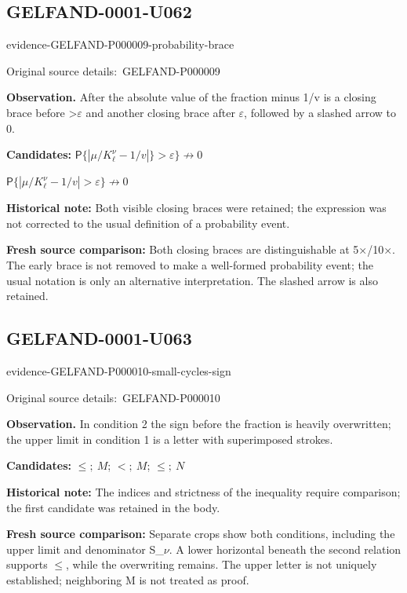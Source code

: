 \documentclass[11pt]{article}
\newcommand{\EvidenceBlock}[4]{%
 \par\smallskip\noindent\begin{minipage}{\linewidth}
 \begin{minipage}[t]{.47\linewidth}\vspace{0pt}\centering
 \csname evidence-#1-#2\endcsname\par
 {\scriptsize\SourceCropCaption\ #1}\par
 \end{minipage}\hfill
 \begin{minipage}[t]{.49\linewidth}\vspace{0pt}\raggedright
 {\small\color{orange!65!black}\textbf{#4} #3}\par
 \end{minipage}
 \end{minipage}\par\smallskip}
\newcommand{\SourceCropCaption}{Original source details:}\newcommand{\ReadingCaption}{Uncertain reading.}\newcommand{\IncompleteCaption}{Undeciphered passage.}\newcommand{\DiagramCaption}{Diagram and typed description.}
\begin{document}
\subsection*{GELFAND-0001-U062}
\EvidenceBlock{GELFAND-P000009}{probability-brace}{After the absolute value of the fraction minus 1/v is a closing brace before >\(\varepsilon\) and another closing brace after \(\varepsilon\), followed by a slashed arrow to 0.}{Observation.}
\par\smallskip\noindent\textbf{Candidates: } \(\mathsf P\{|\mu/K_\ell^\nu-1/v|\}>\varepsilon\}\not\to0\)\par\smallskip\(\mathsf P\{|\mu/K_\ell^\nu-1/v|>\varepsilon\}\not\to0\)\par
\par\smallskip\noindent\textbf{Historical note: } Both visible closing braces were retained; the expression was not corrected to the usual definition of a probability event.\par
\par\smallskip\noindent\textbf{Fresh source comparison: } Both closing braces are distinguishable at 5×/10×. The early brace is not removed to make a well-formed probability event; the usual notation is only an alternative interpretation. The slashed arrow is also retained.\par

\subsection*{GELFAND-0001-U063}
\EvidenceBlock{GELFAND-P000010}{small-cycles-sign}{In condition 2 the sign before the fraction is heavily overwritten; the upper limit in condition 1 is a letter with superimposed strokes.}{Observation.}
\par\smallskip\noindent\textbf{Candidates: } \(\le;\ M\); \(<;\ M\); \(\le;\ N\)\par
\par\smallskip\noindent\textbf{Historical note: } The indices and strictness of the inequality require comparison; the first candidate was retained in the body.\par
\par\smallskip\noindent\textbf{Fresh source comparison: } Separate crops show both conditions, including the upper limit and denominator S\_\(\nu\). A lower horizontal beneath the second relation supports \(\le\), while the overwriting remains. The upper letter is not uniquely established; neighboring M is not treated as proof.\par
\end{document}
